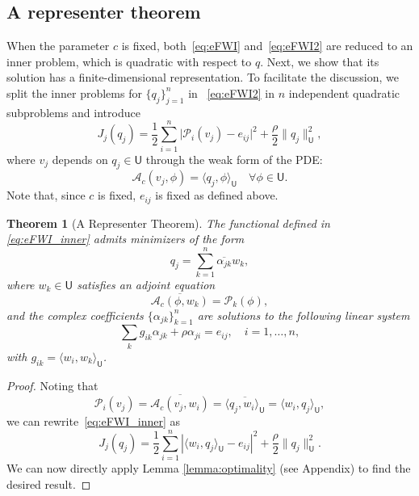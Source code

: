 \documentclass[12pt]{amsart}
\newtheorem{thm}{Theorem}
\begin{document}
\subsection{A representer theorem}
When the parameter $c$ is fixed, both~\eqref{eq:eFWI} and~\eqref{eq:eFWI2} are reduced to an inner problem, which is quadratic with respect to $q$. Next, we show that its solution has a finite-dimensional representation. To facilitate the discussion, we split the inner problems for $\{q_j\}_{j=1}^n$ in ~\eqref{eq:eFWI2} in $n$ independent quadratic subproblems and introduce
\begin{equation}\label{eq:eFWI_inner}
J_j(q_j) =  {\textstyle\frac{1}{2}}\sum_{i=1}^{n}   \big|\mathcal{P}_i(v_j) - e_{ij}\big|^2 +   {\textstyle\frac{\rho}{2}}   \|q_j\|_{\mathsf{U}}^2,
\end{equation}
where $v_j$ depends on $q_j\in \mathsf{U}$ through the weak form of the PDE:
\[
\mathcal{A}_c(v_j,\phi) = \langle q_j,\phi \rangle_\mathsf{U}\quad\forall\phi\in \mathsf{U}.
\]
Note that, since $c$ is fixed, $e_{ij}$ is fixed as defined above. 

\begin{thm}[A Representer Theorem]
\label{thm:Representer}
The functional defined in \eqref{eq:eFWI_inner} admits minimizers of the form
\begin{equation}\label{eq:representation}
q_j = \sum_{k=1}^n \overline{\alpha_{jk}}w_k,
\end{equation}
where $w_k \in \mathsf{U}$ satisfies an adjoint equation
\begin{equation}\label{eq:weakadjoint}
\overline{\mathcal{A}_c(\phi, w_k)} = \mathcal{P}_k(\phi),
\end{equation}
and the complex coefficients $\{\alpha_{jk}\}_{k=1}^n$ are solutions to the following linear system
\[
\sum_{k} g_{ik}\alpha_{jk} + \rho \alpha_{ji} = e_{ij},\quad i=1, \ldots, n,
\]
with $g_{ik} = \langle w_i, w_k\rangle_\mathsf{U}$.
\end{thm}

\begin{proof}
Noting that
$$\mathcal{P}_i({v}_j) = \overline{\mathcal{A}_c(v_j, w_i)} = \overline{ \langle q_j, {w}_i \rangle_{\mathsf{U}}}  = \langle {w}_i, q_j \rangle_{\mathsf{U}},$$
we can rewrite~\eqref{eq:eFWI_inner} as
$$J_j(q_j)={\textstyle\frac{1}{2}}\sum_{i=1}^n |\langle w_i,{q_j}\rangle_{\mathsf{U}} - e_{ij}|^2 + {\textstyle{ {\textstyle\frac{\rho}{2}}}}\|q_j\|_{\mathsf{U}}^2.$$
We can now directly apply Lemma \ref{lemma:optimality} (see Appendix) to find the desired result. 
\end{proof}
\end{document}
